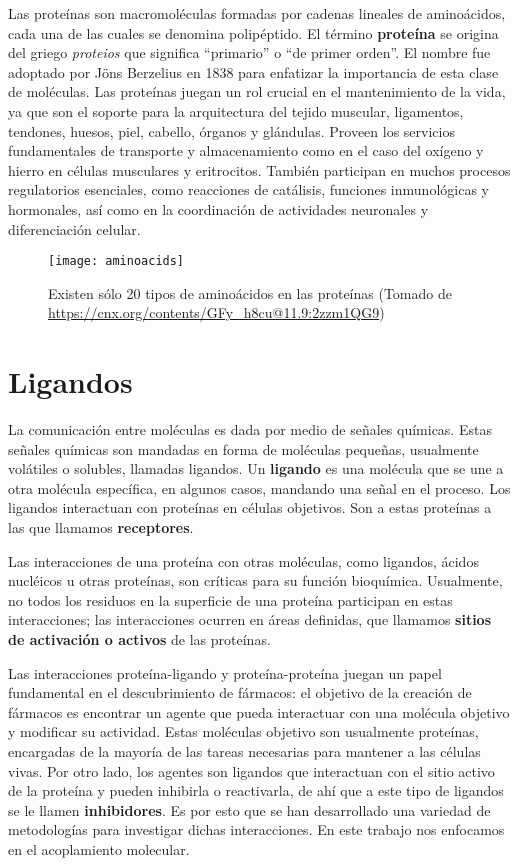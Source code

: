 Las proteínas son macromoléculas formadas por cadenas lineales de
aminoácidos, cada una de las cuales se denomina polipéptido. El
término \textbf{proteína} se origina del griego \textit{proteios} que
significa ``primario'' o ``de primer orden''. El nombre fue adoptado
por Jöns Berzelius en 1838 para enfatizar la importancia de esta clase
de moléculas. Las proteínas juegan un rol crucial en el mantenimiento
de la vida, ya que son el soporte para la arquitectura del tejido
muscular, ligamentos, tendones, huesos, piel, cabello, órganos y
glándulas. Proveen los servicios fundamentales de transporte y
almacenamiento como en el caso del oxígeno y hierro en células
musculares y eritrocitos. También participan en muchos procesos
regulatorios esenciales, como reacciones de catálisis, funciones
inmunológicas y hormonales, así como en la coordinación de actividades
neuronales y diferenciación celular.\cite{tamar}

\begin{figure}[H]
  \texttt{[image: aminoacids]} \centering
  \caption{Existen sólo 20 tipos de aminoácidos en las proteínas
  (Tomado de \url{https://cnx.org/contents/GFy_h8cu@11.9:2zzm1QG9})}
\end{figure}

\section{Ligandos}
La comunicación entre moléculas es dada por medio de señales químicas.
Estas señales químicas son mandadas en forma de moléculas pequeñas,
usualmente volátiles o solubles, llamadas ligandos.
Un \textbf{ligando} es una molécula que se une a otra molécula
específica, en algunos casos, mandando una señal en el proceso. Los
ligandos interactuan con proteínas en células objetivos.  Son a estas
proteínas a las que llamamos \textbf{receptores}.

Las interacciones de una proteína con otras moléculas, como ligandos,
ácidos nucléicos u otras proteínas, son críticas para su función
bioquímica. Usualmente, no todos los residuos en la superficie de una
proteína participan en estas interacciones; las interacciones ocurren
en áreas definidas, que llamamos \textbf{sitios de activación o
activos} de las proteínas.

Las interacciones proteína-ligando y proteína-proteína juegan un papel
fundamental en el descubrimiento de fármacos: el objetivo de la
creación de fármacos es encontrar un agente que pueda interactuar con
una molécula objetivo y modificar su actividad. Estas moléculas
objetivo son usualmente proteínas, encargadas de la mayoría de las
tareas necesarias para mantener a las células vivas. Por otro lado,
los agentes son ligandos que interactuan con el sitio activo de la
proteína y pueden inhibirla o reactivarla, de ahí que a este tipo de
ligandos se le llamen \textbf{inhibidores}. Es por esto que se han
desarrollado una variedad de metodologías para investigar dichas
interacciones. En este trabajo nos enfocamos en el acoplamiento
molecular.

